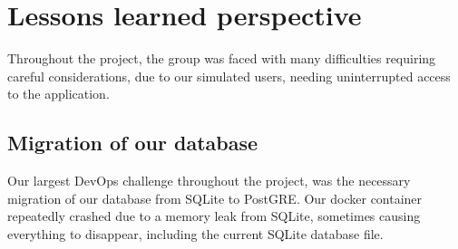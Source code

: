 \section{Lessons learned perspective}






Throughout the project, the group was faced with many difficulties requiring careful considerations, due to our simulated users, needing uninterrupted access to the application.
\subsection{Migration of our database}
Our largest DevOps challenge throughout the project, was the necessary migration of our database from SQLite to PostGRE. %
Our docker container repeatedly crashed due to a memory leak from SQLite, sometimes causing everything to disappear, including the current SQLite database file. \\

